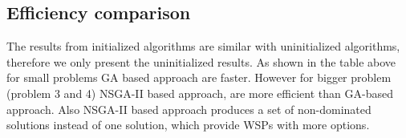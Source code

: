 \documentclass{llncs}
\begin{document}
\begin{flushleft}
\begin{flushleft}
\subsection{Efficiency comparison}
\begin{table}[h]
	\caption{Execution Time (s)}
\end{table}
The results from initialized algorithms are similar with uninitialized algorithms, therefore we only present the uninitialized results.
As shown in the table above for small problems GA based approach are faster. However for bigger problem (problem 3 and 4) NSGA-II based approach, are more efficient than GA-based approach. 
Also NSGA-II based approach produces a set of 
non-dominated solutions instead of one solution, which provide WSPs with more options.

\end{flushleft}
\end{flushleft}
\end{document}

